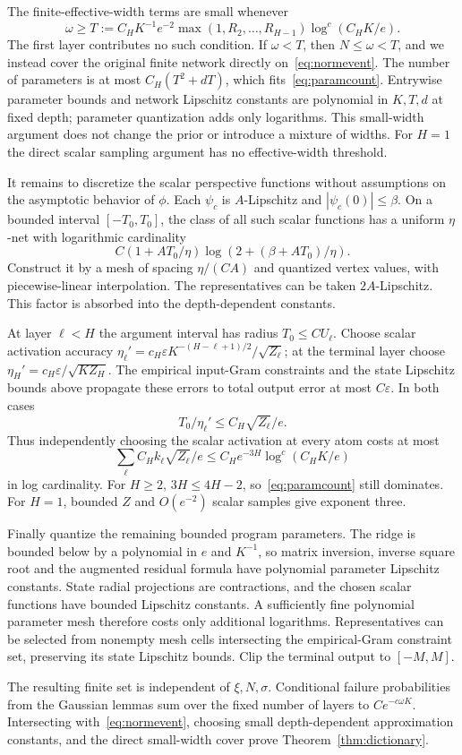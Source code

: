 The finite-effective-width terms are small whenever
\begin{equation}
 \omega\ge T:=C_H K^{-1}e^{-2}
              \max(1,R_2,\ldots,R_{H-1})\log^c(C_HK/e).
 \label{eq:effectivewidth}
\end{equation}
The first layer contributes no such condition. If $\omega<T$, then $N\le\omega<T$, and we instead cover the original finite network directly on~\eqref{eq:normevent}. The number of parameters is at most
$C_H(T^2+dT)$, which fits~\eqref{eq:paramcount}. Entrywise parameter bounds and network Lipschitz constants are polynomial in $K,T,d$ at fixed depth; parameter quantization adds only logarithms. This small-width argument does not change the prior or introduce a mixture of widths. For $H=1$ the direct scalar sampling argument has no effective-width threshold.

It remains to discretize the scalar perspective functions without assumptions on the asymptotic behavior of $\phi$. Each $\psi_c$ is $A$-Lipschitz and $|\psi_c(0)|\le\beta$. On a bounded interval $[-T_0,T_0]$, the class of all such scalar functions has a uniform $\eta$-net with logarithmic cardinality
\[
 C(1+AT_0/\eta)\log(2+(\beta+AT_0)/\eta).
\]
Construct it by a mesh of spacing $\eta/(CA)$ and quantized vertex values, with piecewise-linear interpolation. The representatives can be taken $2A$-Lipschitz. This factor is absorbed into the depth-dependent constants.

At layer $\ell<H$ the argument interval has radius $T_0\le C U_\ell$.
Choose scalar activation accuracy
$\eta_\ell'=c_H\varepsilon K^{-(H-\ell+1)/2}/\sqrt{Z_\ell}$;
at the terminal layer choose
$\eta_H'=c_H\varepsilon/\sqrt{KZ_H}$.
The empirical input-Gram constraints and the state Lipschitz bounds above propagate these errors to total output error at most $C\varepsilon$. In both cases
\[
 T_0/\eta_\ell'\le C_H\sqrt{Z_\ell}/e.
\]
Thus independently choosing the scalar activation at every atom costs at most
\[
 \sum_\ell C_H k_\ell\sqrt{Z_\ell}/e
 \le C_H e^{-3H}\log^c(C_HK/e)
\]
in log cardinality. For $H\ge2$, $3H\le4H-2$, so~\eqref{eq:paramcount} still dominates.
For $H=1$, bounded $Z$ and $O(e^{-2})$ scalar samples give exponent three.

Finally quantize the remaining bounded program parameters. The ridge is bounded below by a polynomial in $e$ and $K^{-1}$, so matrix inversion, inverse square root and the augmented residual formula have polynomial parameter Lipschitz constants. State radial projections are contractions, and the chosen scalar functions have bounded Lipschitz constants. A sufficiently fine polynomial parameter mesh therefore costs only additional logarithms. Representatives can be selected from nonempty mesh cells intersecting the empirical-Gram constraint set, preserving its state Lipschitz bounds. Clip the terminal output to $[-M,M]$.

The resulting finite set is independent of $\xi,N,\sigma$. Conditional failure probabilities from the Gaussian lemmas sum over the fixed number of layers to $Ce^{-c\omega K}$. Intersecting with~\eqref{eq:normevent}, choosing small depth-dependent approximation constants, and the direct small-width cover prove Theorem~\ref{thm:dictionary}.
